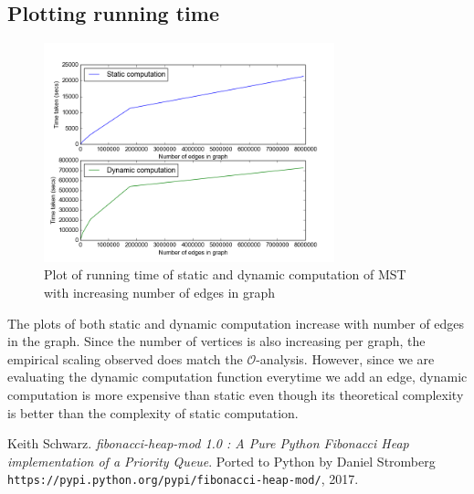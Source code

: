 \documentclass[a4paper]{article}
\begin{document}
\subsection*{Plotting running time}
\begin{figure}[H]
\centering
    \includegraphics[width=0.75\textwidth]{../results/Plot.png}
    \caption{Plot of running time of static and dynamic computation of MST with increasing number of edges in graph}
    \label{fig:plot}
\end{figure}
The plots of both static and dynamic computation increase with number of edges in the graph. Since the number of vertices is also increasing per graph, the empirical scaling observed does match the $\mathcal{O}$-analysis. However, since we are evaluating the dynamic computation function everytime we add an edge, dynamic computation is more expensive than static even though its theoretical complexity is better than the complexity of static computation.

\begin{thebibliography}{9}
Keith Schwarz.
\textit{fibonacci-heap-mod 1.0 : A Pure Python Fibonacci Heap implementation of a Priority Queue}. 
Ported to Python by Daniel Stromberg
\\\texttt{https://pypi.python.org/pypi/fibonacci-heap-mod/}, 2017.

\end{thebibliography}
\end{document}
